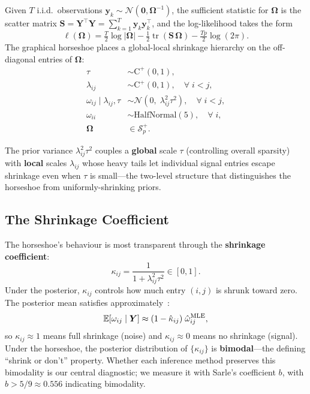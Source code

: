 \documentclass[10pt,conference,compsoc]{IEEEtran}
\newcommand{\tr}{\operatorname{tr}} \newcommand{\KL}{\operatorname{KL}} \newcommand{\ELBO}{\operatorname{ELBO}}
\newcommand{\Normal}{\mathcal{N}} \newcommand{\HalfCauchy}{\mathrm{C}^{+}} \newcommand{\InvGamma}{\mathrm{IG}}
\newcommand{\Spp}{\mathcal{S}^{+}_p} \newcommand{\bOmega}{\bm{\Omega}} \newcommand{\bSigma}{\bm{\Sigma}}
\begin{document}
Given $T$ i.i.d.\ observations $\bm{y}_k \sim \Normal(\bm{0}, \bOmega^{-1})$, the sufficient statistic for $\bOmega$ is the scatter matrix $\bm{S} = \bm{Y}^\top\bm{Y} = \sum_{k=1}^T \bm{y}_k\bm{y}_k^\top$, and the log-likelihood takes the form
\begin{equation}
  \ell(\bOmega) = \tfrac{T}{2}\log|\bOmega| - \tfrac{1}{2}\tr(\bm{S}\,\bOmega) - \tfrac{Tp}{2}\log(2\pi).
  \label{eq:loglik}
\end{equation}
The graphical horseshoe places a global-local shrinkage hierarchy on the off-diagonal entries of $\bOmega$:
\begin{align}
  \tau &\sim \HalfCauchy(0, 1), \label{eq:tau}\\
  \lambda_{ij} &\sim \HalfCauchy(0, 1), \quad \forall\; i < j, \label{eq:lam}\\
  \omega_{ij} \mid \lambda_{ij}, \tau &\sim \Normal(0,\; \lambda_{ij}^2 \tau^2), \quad \forall\; i < j, \label{eq:offdiag}\\
  \omega_{ii} &\sim \text{HalfNormal}(5), \quad \forall\; i, \label{eq:diag}\\
  \bOmega &\in \Spp. \label{eq:pd}
\end{align}

The prior variance $\lambda_{ij}^2\tau^2$ couples a \textbf{global} scale $\tau$ (controlling overall sparsity) with \textbf{local} scales $\lambda_{ij}$ whose heavy tails let individual signal entries escape shrinkage even when $\tau$ is small---the two-level structure that distinguishes the horseshoe from uniformly-shrinking priors.

\subsection{The Shrinkage Coefficient}

The horseshoe's behaviour is most transparent through the \textbf{shrinkage coefficient}:
\begin{equation}
  \kappa_{ij} = \frac{1}{1 + \lambda_{ij}^2 \tau^2} \in [0,1].
  \label{eq:kappa}
\end{equation}
Under the posterior, $\kappa_{ij}$ controls how much entry $(i,j)$ is shrunk toward zero. The posterior mean satisfies approximately~\cite{carvalho2010}:
\begin{equation}
  \mathbb{E}[\omega_{ij} \mid \bm{Y}] \approx (1 - \hat\kappa_{ij})\;\hat\omega_{ij}^{\text{MLE}},
  \label{eq:shrinkage-rule}
\end{equation}
so $\kappa_{ij} \approx 1$ means full shrinkage (noise) and $\kappa_{ij} \approx 0$ means no shrinkage (signal). Under the horseshoe, the posterior distribution of $\{\kappa_{ij}\}$ is \textbf{bimodal}---the defining ``shrink or don't'' property. Whether each inference method preserves this bimodality is our central diagnostic; we measure it with Sarle's coefficient $b$, with $b > 5/9 \approx 0.556$ indicating bimodality.
\end{document}
